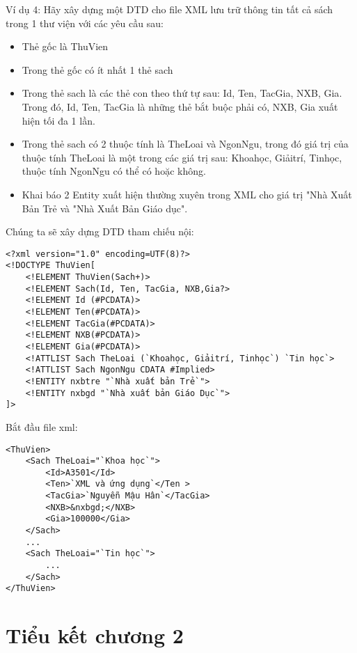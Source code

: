 Ví dụ 4: Hãy xây dựng một DTD cho file XML lưu trữ thông tin tất cả sách trong 1 thư viện với các yêu cầu sau:
\begin{itemize}


\item  Thẻ gốc là {\ttfamily ThuVien}
  
\item  Trong thẻ gốc có ít nhất 1 thẻ {\ttfamily sach}
  
\item  Trong thẻ {\ttfamily sach} là các thẻ con theo thứ tự sau: {\ttfamily Id, Ten, TacGia, NXB, Gia}. Trong đó, {\ttfamily Id, Ten, TacGia} là những thẻ bắt buộc phải có, {\ttfamily NXB, Gia} xuất hiện tối đa 1 lần.
  
\item  Trong thẻ {\ttfamily sach} có 2 thuộc tính là {\ttfamily TheLoai} và {\ttfamily  NgonNgu}, trong đó giá trị của thuộc tính {\ttfamily TheLoai} là một trong các giá trị sau:
{\ttfamily  Khoahọc, Giảitrí, Tinhọc}, thuộc tính  {\ttfamily NgonNgu} có thể có hoặc không.
 
 \item  Khai báo 2 Entity xuất hiện thường xuyên trong XML cho giá trị {\ttfamily "Nhà Xuất Bản Trẻ} và {\ttfamily "Nhà Xuất Bản Giáo dục"}.
  \end{itemize}
  
  Chúng ta sẽ xây dựng DTD tham chiếu nội:
\lstset{language=XML}
\begin{lstlisting}[escapechar=`]
<?xml version="1.0" encoding=UTF(8)?>
<!DOCTYPE ThuVien[
	<!ELEMENT ThuVien(Sach+)>
	<!ELEMENT Sach(Id, Ten, TacGia, NXB,Gia?>
	<!ELEMENT Id (#PCDATA)>
	<!ELEMENT Ten(#PCDATA)>
	<!ELEMENT TacGia(#PCDATA)>
	<!ELEMENT NXB(#PCDATA)>
	<!ELEMENT Gia(#PCDATA)>
	<!ATTLIST Sach TheLoai (`Khoahọc, Giảitrí, Tinhọc`) `Tin học`>
	<!ATTLIST Sach NgonNgu CDATA #Implied>
	<!ENTITY nxbtre "`Nhà xuất bản Trẻ`">
	<!ENTITY nxbgd "`Nhà xuất bản Giáo Dục`">
]>
\end{lstlisting} 

Bắt đầu file xml:
\lstset{language=XML}
\begin{lstlisting}[escapechar=`]
<ThuVien>
	<Sach TheLoai="`Khoa học`">
		<Id>A3501</Id>
		<Ten>`XML và ứng dụng`</Ten >
		<TacGia>`Nguyễn Mậu Hân`</TacGia> 
		<NXB>&nxbgd;</NXB>
		<Gia>100000</Gia>
	</Sach>
	...
	<Sach TheLoai="`Tin học`">
		...
	</Sach>
</ThuVien>
\end{lstlisting}
\section {Tiểu kết chương 2}
\label{muc2.6}


